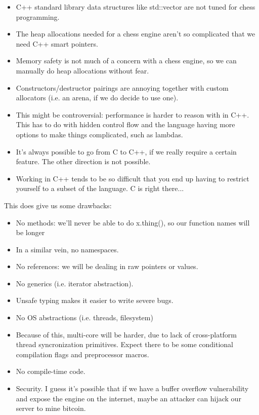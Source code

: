 \documentclass[letterpaper,11pt]{article}
\begin{document}
\begin{itemize}
\item C++ standard library data structures like std::vector are not tuned for chess programming.
\item The heap allocations needed for a chess engine aren’t so complicated that we need C++ smart pointers.
\item Memory safety is not much of a concern with a chess engine, so we can manually do heap allocations without fear.
\item Constructors/destructor pairings are annoying together with custom allocators (i.e. an arena, if we do decide to use one).
\item This might be controversial: performance is harder to reason with in C++. This has to do with hidden control flow and the language having more options to make things complicated, such as lambdas.
\item It's always possible to go from C to C++, if we really require a certain feature. The other direction is not possible.
\item Working in C++ tends to be so difficult that you end up having to restrict yourself to a subset of the language. C is right there...
\end{itemize}
This does give us some drawbacks:
\begin{itemize}
\item No methods: we’ll never be able to do x.thing(), so our function names will be longer
\item In a similar vein, no namespaces.
\item No references: we will be dealing in raw pointers or values.
\item No generics (i.e. iterator abstraction).
\item Unsafe typing makes it easier to write severe bugs.
\item No OS abstractions (i.e. threads, filesystem)
\item Because of this, multi-core will be harder, due to lack of cross-platform thread syncronization primitives.
Expect there to be some conditional compilation flags and preprocessor macros.
\item No compile-time code.
\item Security. I guess it’s possible that if we have a buffer overflow vulnerability and expose the engine on the internet, maybe an attacker can hijack our server to mine bitcoin.
\end{itemize}
\end{document}
